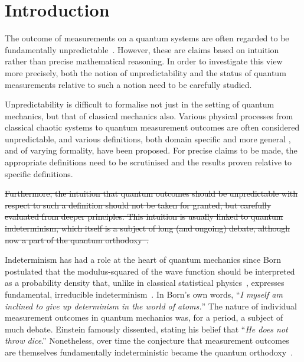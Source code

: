 \documentclass[%
 superscriptaddress,
 preprint,
 showpacs,
 showkeys,
 preprintnumbers,
  amsmath,amssymb,
  aps,
 pra,
  longbibliography,
  floatfix,
 ]{revtex4-1}
\theoremstyle{definition}
\begin{document}
\section{Introduction}

The outcome of measurements on a quantum systems are often regarded to be fundamentally unpredictable~\cite{zeil-05_nature_ofQuantum}.
However, these are claims based on intuition rather than precise mathematical reasoning.
In order to investigate this view more precisely, both the notion of unpredictability and the status of quantum measurements relative to such a notion need to be carefully studied.

Unpredictability is difficult to formalise not just in the setting of quantum mechanics, but that of classical mechanics also.
Various physical processes from classical chaotic systems to quantum measurement outcomes are often considered unpredictable, and various definitions, both domain specific \cite{Werndl:2009nx} and more general \cite{Eagle:2005ys}, and of varying formality, have been proposed.
For precise claims to be made, the appropriate definitions need to be scrutinised and the results proven relative to specific definitions.

{\color{green}\sout{Furthermore, the intuition that quantum outcomes should be unpredictable with respect to such a definition should not be taken for granted, but carefully evaluated from deeper principles.
This intuition is usually linked to quantum indeterminism, which itself is a subject of long (and ongoing) debate, although now a part of the quantum orthodoxy~\cite{zeil-05_nature_ofQuantum}.
}}

Indeterminism has had a role at the heart of quantum mechanics since Born postulated that the modulus-squared of the wave function should be interpreted as a probability density that, unlike in classical statistical physics~\cite{Myrvold2011237}, expresses fundamental,  irreducible indeterminism~\cite{born-26-1}.
In Born's own words, ``{\em I myself am inclined  to give up determinism in the world of atoms.}''
The nature of individual measurement outcomes in quantum mechanics was, for a period, a subject of much debate.
Einstein famously dissented, stating his belief that \cite[p. 204]{born-69} ``\emph{He does not throw dice}.''
Nonetheless, over time the conjecture that measurement outcomes are themselves fundamentally indeterministic became the quantum orthodoxy~\cite{zeil-05_nature_ofQuantum}.
\fi
\end{document}
